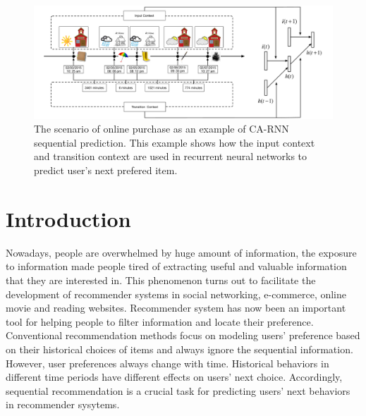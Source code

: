\documentclass[conference]{IEEEtran}
\begin{document}
\begin{figure}[htb]
\centering
\includegraphics[width=1\linewidth]{./introModel.pdf}
\caption{The scenario of online purchase as an example of CA-RNN sequential prediction. This example shows how the input context and transition context are used in recurrent neural networks to predict user's next prefered item.}
\label{fig:Model-intro}
\end{figure}

\section{Introduction}
Nowadays, people are overwhelmed by huge amount of information, the exposure to information made people tired of extracting useful and valuable information that they are interested in. This phenomenon turns out to facilitate the development of recommender systems in social networking, e-commerce, online movie and reading websites. Recommender system has now been an important tool for helping people to filter information and locate their preference. Conventional recommendation methods focus on modeling users' preference based on their historical choices of items and always ignore the sequential information. However, user preferences always change with time. Historical behaviors in different time periods have different effects on users' next choice. Accordingly, sequential recommendation is a crucial task for predicting users' next behaviors in recommender sysytems.
\end{document}
